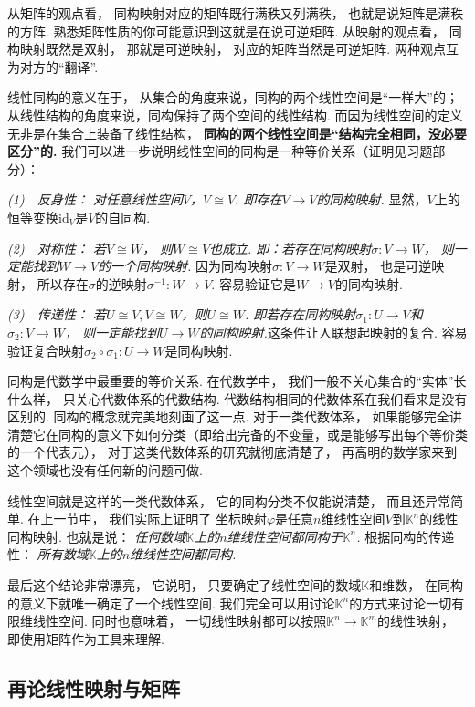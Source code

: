 从矩阵的观点看，
同构映射对应的矩阵既行满秩又列满秩，
也就是说矩阵是满秩的方阵.
熟悉矩阵性质的你可能意识到这就是在说可逆矩阵.
从映射的观点看，
同构映射既然是双射，
那就是可逆映射，
对应的矩阵当然是可逆矩阵.
两种观点互为对方的“翻译”.
\medskip

线性同构的意义在于，
从集合的角度来说，同构的两个线性空间是“一样大”的；
从线性结构的角度来说，同构保持了两个空间的线性结构.
而因为线性空间的定义无非是在集合上装备了线性结构，
\textbf{同构的两个线性空间是“结构完全相同，没必要区分”的.}
我们可以进一步说明线性空间的同构是一种等价关系（证明见习题部分）：

\textit{(1)~~反身性：
对任意线性空间$V$，$V \cong V$.
即存在$V \to V$的同构映射.}
显然，$V$上的恒等变换$\text{id}_V$是$V$的自同构.

\textit{(2)~~对称性：
若$V \cong W$，
则$W \cong V$也成立.
即：若存在同构映射$\sigma : V \to W$，
则一定能找到$W \to V$的一个同构映射.}
因为同构映射$\sigma: V \to W$是双射，
也是可逆映射，
所以存在$\sigma$的逆映射$\sigma ^{-1} : W \to V$.
容易验证它是$W \to V$的同构映射.

\textit{(3)~~传递性：
若$U \cong V, V \cong W$，则$U \cong W$.
即若存在同构映射$\sigma_1 : U \to V$和$\sigma_2 : V \to W$，
则一定能找到$U \to W$的同构映射.}这条件让人联想起映射的复合.
容易验证复合映射$\sigma_2 \circ \sigma_1: U \to W$是同构映射.\medskip

同构是代数学中最重要的等价关系.
在代数学中，
我们一般不关心集合的“实体”长什么样，
只关心代数体系的代数结构.
代数结构相同的代数体系在我们看来是没有区别的.
同构的概念就完美地刻画了这一点.
对于一类代数体系，
如果能够完全讲清楚它在同构的意义下如何分类（即给出完备的不变量，或是能够写出每个等价类的一个代表元），
对于这类代数体系的研究就彻底清楚了，
再高明的数学家来到这个领域也没有任何新的问题可做.

线性空间就是这样的一类代数体系，
它的同构分类不仅能说清楚，
而且还异常简单.
在上一节中，
我们实际上证明了
坐标映射$\varphi$是任意$n$维线性空间$V$到$\mathbb{K}^n$的线性同构映射.
也就是说：
\textit{任何数域$\mathbb{K}$上的$n$维线性空间都同构于$\mathbb{K}^n$.}
根据同构的传递性：
\textit{所有数域$\mathbb{K}$上的$n$维线性空间都同构.}

最后这个结论非常漂亮，
它说明，
只要确定了线性空间的数域$\mathbb{K}$和维数，
在同构的意义下就唯一确定了一个线性空间.
我们完全可以用讨论$\mathbb{K}^n$的方式来讨论一切有限维线性空间.
同时也意味着，
一切线性映射都可以按照$\mathbb{K}^n \to \mathbb{K}^m$的线性映射，
即使用矩阵作为工具来理解.


\subsection{再论线性映射与矩阵}

